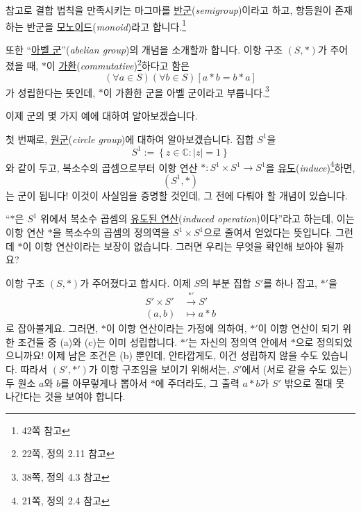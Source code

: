 \documentclass[12pt]{paper}
\begin{document}
  참고로 결합 법칙을 만족시키는 마그마를 \underline{반군}(\textit{semigroup})이라고 하고,
  항등원이 존재하는 반군을 \underline{모노이드}(\textit{monoid})라고 합니다.\footnote{\cite{fraleigh2009} 42쪽 참고}

  또한 ``\underline{아벨 군}''(\textit{abelian group})의 개념을 소개할까 합니다.
  이항 구조 $\left( S , * \right)$가 주어졌을 때,
  $*$이 \underline{가환}(\textit{commutative})\footnote{\cite{fraleigh2009} 22쪽, 정의 2.11 참고}하다고 함은
  \begin{equation*}
    \left( \forall a \in S \right) \left( \forall b \in S \right) \left[ a * b = b * a \right] \tag{4}
  \end{equation*}
  가 성립한다는 뜻인데,
  $*$이 가환한 군을 아벨 군이라고 부릅니다.\footnote{\cite{fraleigh2009} 38쪽, 정의 4.3 참고}

  이제 군의 몇 가지 예에 대하여 알아보겠습니다.

  첫 번째로, \underline{원군}(\textit{circle group})에 대하여 알아보겠습니다.
  집합 $S^1$을
  \begin{equation*}
    S^1 := \left\{ z \in \mathbb{C} : \left| z \right| = 1 \right\} \tag{5}
  \end{equation*}
  와 같이 두고,
  복소수의 곱셈으로부터 이항 연산 $* : S^1 \times S^1 \to S^1$을 \underline{유도}(\textit{induce})\footnote{\cite{fraleigh2009} 21쪽, 정의 2.4 참고}하면,
  $$\left( S^1 , * \right)$$는 군이 됩니다!
  이것이 사실임을 증명할 것인데, 그 전에 다뤄야 할 개념이 있습니다.

  ``$*$은 $S^1$ 위에서 복소수 곱셈의 \underline{유도된 연산}(\textit{induced operation})이다''라고 하는데,
  이는 이항 연산 $*$을 복소수의 곱셈의 정의역을 $S^1 \times S^1$으로 줄여서 얻었다는 뜻입니다.
  그런데 $*$이 이항 연산이라는 보장이 없습니다.
  그러면 우리는 무엇을 확인해 보아야 될까요?

  이항 구조 $\left( S , * \right)$가 주어졌다고 합시다.
  이제 $S$의 부분 집합 $S'$를 하나 잡고, $*'$을
  \begin{align*}
    S' \times S' & \xrightarrow{*'} S' \\
    \left( a , b \right) & \mapsto a * b
  \end{align*}
  로 잡아볼게요.
  그러면, $*$이 이항 연산이라는 가정에 의하여,
  $*'$이 이항 연산이 되기 위한 조건들 중 (a)와 (c)는 이미 성립합니다.
  $*'$는 자신의 정의역 안에서 $*$으로 정의되었으니까요!
  이제 남은 조건은 (b) 뿐인데, 안타깝게도, 이건 성립하지 않을 수도 있습니다.
  따라서 $\left( S' , *' \right)$가 이항 구조임을 보이기 위해서는,
  $S'$에서 (서로 같을 수도 있는) 두 원소 $a$와 $b$를 아무렇게나 뽑아서 $*$에 주더라도,
  그 출력 $a * b$가 $S'$ 밖으로 절대 못 나간다는 것을 보여야 합니다.
\end{document}
